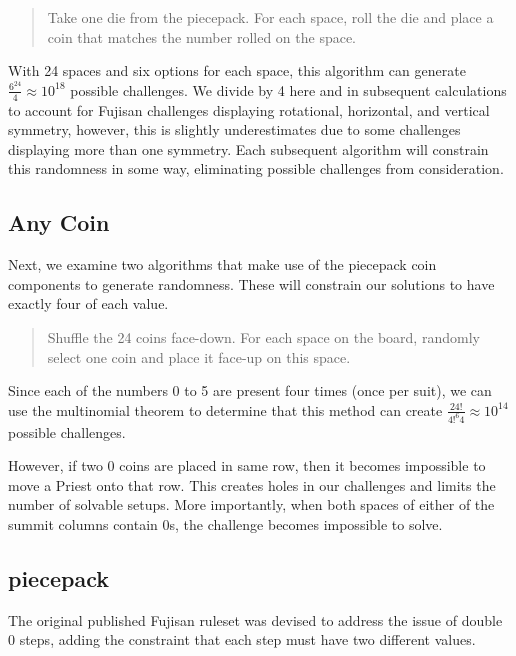 \documentclass[10pt,journal,compsoc]{IEEEtran}
\begin{document}
\begin{quote}
    
  Take one die from the piecepack. For each space, roll the die and place a coin that matches the number rolled on the space.
\end{quote}

With 24 spaces and six options for each space, this algorithm can generate $\frac{6^{24}}{4} \approx 10^{18}$ possible challenges. We divide by 4 here and in subsequent calculations to account for Fujisan challenges displaying rotational, horizontal, and vertical symmetry, however, this is slightly underestimates due to some challenges displaying more than one symmetry. Each subsequent algorithm will constrain this randomness in some way, eliminating possible challenges from consideration.

\subsection{Any Coin}

Next, we examine two algorithms that make use of the piecepack coin components to generate randomness. These will constrain our solutions to have exactly four of each value.

\begin{quote}
    
  Shuffle the 24 coins face-down. For each space on the board, randomly select one coin and place it face-up on this space.
  
\end{quote}

Since each of the numbers 0 to 5 are present four times (once per suit), we can use the multinomial theorem to determine that this method can create
$\frac{24!}{4!^{6}4} \approx 10^{14}$ possible challenges. 

However, if two 0 coins are placed in same row, then it becomes impossible to move a Priest onto that row. This creates holes in our challenges and limits the number of solvable setups. 
More importantly, when both spaces of either of the summit columns contain 0s, the challenge becomes impossible to solve.


\subsection{piecepack}

The original published Fujisan ruleset was devised to address the issue of double 0 steps, adding the constraint that each step must have two different values.
\end{document}

